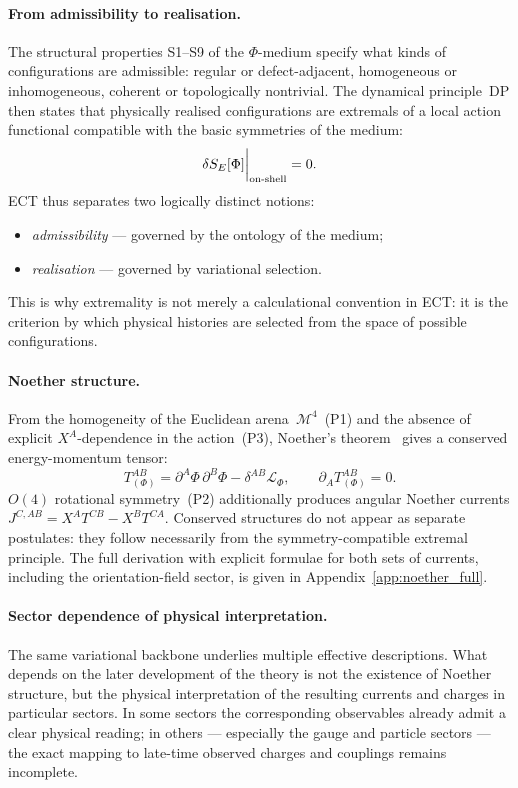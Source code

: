 \documentclass[11pt,a4paper]{article}
\numberwithin{equation}{section}
\begin{document}
\paragraph{From admissibility to realisation.}
The structural properties S1--S9 of the $\Phi$-medium specify what
kinds of configurations are admissible: regular or defect-adjacent,
homogeneous or inhomogeneous, coherent or topologically nontrivial.
The dynamical principle~DP then states that physically realised
configurations are extremals of a local action functional compatible
with the basic symmetries of the medium:
\begin{equation}
  \label{eq:variational}
  \delta S_E[\Phi]\bigg|_{\rm on\text{-}shell} = 0.
\end{equation}
ECT thus separates two logically distinct notions:
\begin{itemize}
  \item \emph{admissibility} --- governed by the ontology of the medium;
  \item \emph{realisation} --- governed by variational selection.
\end{itemize}
This is why extremality is not merely a calculational convention in ECT:
it is the criterion by which physical histories are selected from the
space of possible configurations.

\paragraph{Noether structure.}
From the homogeneity of the Euclidean arena~$\mathcal{M}^4$~(P1) and
the absence of explicit $X^A$-dependence in the action~(P3), Noether's
theorem~\cite{Noether1918} gives a conserved energy-momentum tensor:
\begin{equation}
  T^{AB}_{(\Phi)} = \partial^A\Phi\,\partial^B\Phi
  - \delta^{AB}\mathcal{L}_\Phi,
  \qquad \partial_A T^{AB}_{(\Phi)} = 0.
\end{equation}
$O(4)$ rotational symmetry~(P2) additionally produces angular Noether
currents $J^{C,AB} = X^A T^{CB} - X^B T^{CA}$.
Conserved structures do not appear as separate postulates: they follow
necessarily from the symmetry-compatible extremal principle.
The full derivation with explicit formulae for both sets of currents,
including the orientation-field sector, is given in
Appendix~\ref{app:noether_full}.

\paragraph{Sector dependence of physical interpretation.}
The same variational backbone underlies multiple effective descriptions.
What depends on the later development of the theory is not the
existence of Noether structure, but the physical interpretation of the
resulting currents and charges in particular sectors.
In some sectors the corresponding observables already admit a clear
physical reading; in others --- especially the gauge and particle
sectors --- the exact mapping to late-time observed charges and
couplings remains incomplete.
\end{document}
